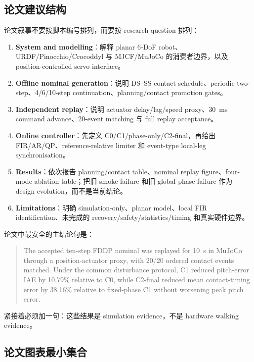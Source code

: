 \documentclass[UTF8,11pt,a4paper]{ctexart}
\begin{document}
\subsection{论文建议结构}

论文叙事不要按脚本编号排列，而要按 research question 排列：
\begin{enumerate}
 \item \textbf{System and modelling}：解释 planar 6-DoF robot、URDF/Pinocchio/Crocoddyl 与 MJCF/MuJoCo 的消费者边界，以及 position-controlled servo interface。
 \item \textbf{Offline nominal generation}：说明 DS--SS contact schedule、periodic two-step、4/6/10-step continuation、planning/contact promotion gates。
 \item \textbf{Independent replay}：说明 actuator delay/lag/speed proxy、\SI{30}{ms} command advance、20-event matching 与 full replay acceptance。
 \item \textbf{Online controller}：先定义 C0/C1/phase-only/C2-final，再给出 FIR/AR/QP、reference-relative limiter 和 event-type local-leg synchronisation。
 \item \textbf{Results}：依次报告 planning/contact table、nominal replay figure、four-mode ablation table；把旧 smoke failure 和旧 global-phase failure 作为 design evolution，而不是当前结论。
 \item \textbf{Limitations}：明确 simulation-only、planar model、local FIR identification、未完成的 recovery/safety/statistics/timing 和真实硬件边界。
\end{enumerate}

论文中最安全的主结论句是：
\begin{quote}
The accepted ten-step FDDP nominal was replayed for \SI{10}{s} in MuJoCo through a position-actuator proxy, with 20/20 ordered contact events matched. Under the common disturbance protocol, C1 reduced pitch-error IAE by 10.79\% relative to C0, while C2-final reduced mean contact-timing error by 38.16\% relative to fixed-phase C1 without worsening peak pitch error.
\end{quote}
紧接着必须加一句：这些结果是 simulation evidence，不是 hardware walking evidence。

\subsection{论文图表最小集合}
\end{document}
